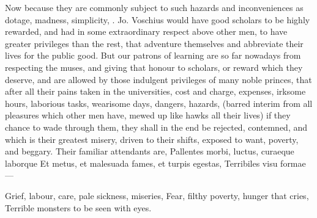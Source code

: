 {Now because they are commonly subject to such hazards and
inconveniences as dotage, madness, simplicity, \etc{}. Jo. Voschius would
have good scholars to be highly rewarded, and had in some extraordinary
respect above other men, to have greater privileges than the
rest, that adventure themselves and abbreviate their lives for the
public good. But our patrons of learning are so far nowadays from
respecting the muses, and giving that honour to scholars, or reward
which they deserve, and are allowed by those indulgent privileges of
many noble princes, that after all their pains taken in the
universities, cost and charge, expenses, irksome hours, laborious
tasks, wearisome days, dangers, hazards, (barred interim from all
pleasures which other men have, mewed up like hawks all their lives) if
they chance to wade through them, they shall in the end be rejected,
contemned, and which is their greatest misery, driven to their shifts,
exposed to want, poverty, and beggary. Their familiar attendants are,
Pallentes morbi, luctus, curaeque laborque
Et metus, et malesuada fames, et turpis egestas,
Terribiles visu formae---

Grief, labour, care, pale sickness, miseries,
Fear, filthy poverty, hunger that cries,
Terrible monsters to be seen with eyes.

}
